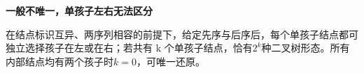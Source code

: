 {\color{ink}\bfseries 一般不唯一，单孩子左右无法区分}\par\vspace{1bp}在结点标识互异、两序列相容的前提下，给定先序与后序后，每个单孩子结点都可独立选择孩子在左或在右；若共有 k 个单孩子结点，恰有\(2^{k}\)种二叉树形态。所有内部结点均有两个孩子时\(k=\allowbreak{}0\)，可唯一还原。
